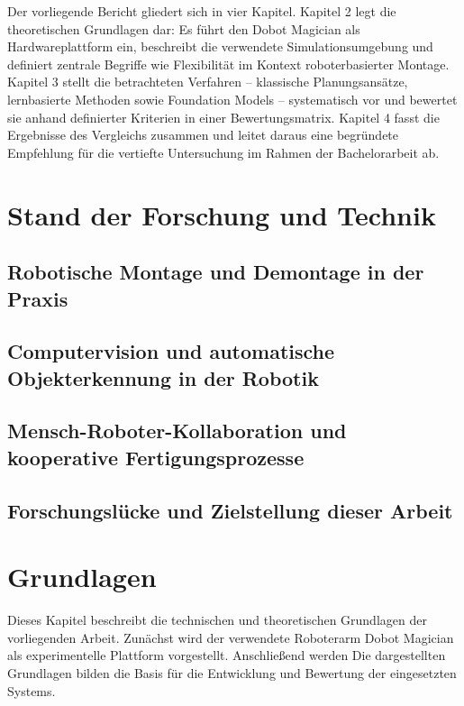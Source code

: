 \documentclass[12pt]{article}
\begin{document}
Der vorliegende Bericht gliedert sich in vier Kapitel. Kapitel 2 legt die theoretischen Grundlagen dar: Es führt den Dobot Magician als Hardwareplattform ein, beschreibt die verwendete Simulationsumgebung und definiert zentrale Begriffe wie Flexibilität im Kontext roboterbasierter Montage. Kapitel 3 stellt die betrachteten Verfahren – klassische Planungsansätze, lernbasierte Methoden sowie Foundation Models – systematisch vor und bewertet sie anhand definierter Kriterien in einer Bewertungsmatrix. Kapitel 4 fasst die Ergebnisse des Vergleichs zusammen und leitet daraus eine begründete Empfehlung für die vertiefte Untersuchung im Rahmen der Bachelorarbeit ab.

\newpage

\section{Stand der Forschung und Technik}
\subsection{Robotische Montage und Demontage in der Praxis}
\subsection{Computervision und automatische Objekterkennung in der Robotik}
\subsection{Mensch-Roboter-Kollaboration und kooperative Fertigungsprozesse}
\subsection{Forschungslücke und Zielstellung dieser Arbeit}

\newpage

\section{Grundlagen}
Dieses Kapitel beschreibt die technischen und theoretischen Grundlagen der vorliegenden Arbeit. Zunächst wird der verwendete Roboterarm Dobot Magician als experimentelle Plattform vorgestellt. Anschließend werden 
Die dargestellten Grundlagen bilden die Basis für die Entwicklung und Bewertung der eingesetzten Systems. %
\end{document}
